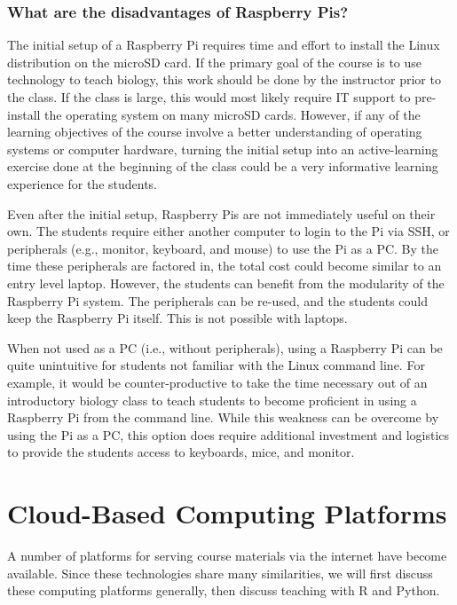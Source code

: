 \subsubsection{What are the disadvantages of Raspberry Pis?}

The initial setup of a Raspberry Pi requires time and effort to install the
Linux distribution on the microSD card.
If the primary goal of the course is to use technology to teach biology,
this work should be done by the instructor prior to the class.
If the class is large, this would most likely require IT support to pre-install
the operating system on many microSD cards.
However, if any of the learning objectives of the course involve
a better understanding of operating systems or computer hardware,
turning the initial setup into an active-learning exercise done
at the beginning of the class could be a very informative
learning experience for the students.

Even after the initial setup, Raspberry Pis are not immediately useful on their
own.
The students require either another computer to login to the Pi via SSH, or
peripherals (e.g., monitor, keyboard, and mouse) to use the Pi as a PC.
By the time these peripherals are factored in, the total cost could become
similar to an entry level laptop.
However, the students can benefit from the modularity of the Raspberry Pi
system.
The peripherals can be re-used, and the students could keep the Raspberry Pi
itself.
This is not possible with laptops.

When not used as a PC (i.e., without peripherals), using a Raspberry Pi can be
quite unintuitive for students not familiar with the Linux command line.
For example, it would be counter-productive to take the time necessary
out of an introductory biology class to teach students to become proficient
in using a Raspberry Pi from the command line.
While this weakness can be overcome by using the Pi as a PC, this option does
require additional investment and logistics to provide the students access to
keyboards, mice, and monitor.


\section{Cloud-Based Computing Platforms}

A number of platforms for serving course materials via the internet have become available. 
Since these technologies share many similarities, we will first discuss these computing platforms generally,
then discuss teaching with R and Python.


